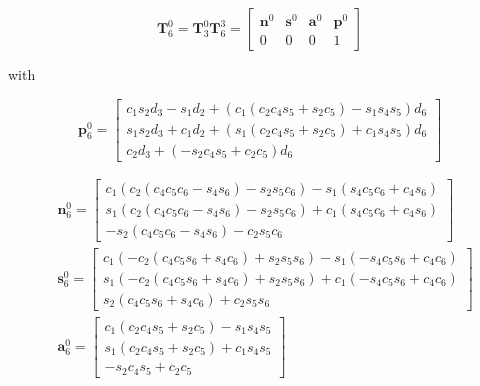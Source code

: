 \documentclass[10pt]{article}
\begin{document}
$$
\boldsymbol{T}_{6}^{0}=\boldsymbol{T}_{3}^{0} \boldsymbol{T}_{6}^{3}=\left[\begin{array}{cccc}
\boldsymbol{n}^{0} & \boldsymbol{s}^{0} & \boldsymbol{a}^{0} & \boldsymbol{p}^{0} \\
0 & 0 & 0 & 1
\end{array}\right]
$$

\noindent
with

$$
\boldsymbol{p}_{6}^{0}=\left[\begin{array}{c}
c_{1} s_{2} d_{3}-s_{1} d_{2}+\left(c_{1}\left(c_{2} c_{4} s_{5}+s_{2} c_{5}\right)-s_{1} s_{4} s_{5}\right) d_{6} \\
s_{1} s_{2} d_{3}+c_{1} d_{2}+\left(s_{1}\left(c_{2} c_{4} s_{5}+s_{2} c_{5}\right)+c_{1} s_{4} s_{5}\right) d_{6} \\
c_{2} d_{3}+\left(-s_{2} c_{4} s_{5}+c_{2} c_{5}\right) d_{6}
\end{array}\right]
$$



$$
\begin{aligned}
& \boldsymbol{n}_{6}^{0}= {\left[\begin{array}{c}
c_{1}\left(c_{2}\left(c_{4} c_{5} c_{6}-s_{4} s_{6}\right)-s_{2} s_{5} c_{6}\right)-s_{1}\left(s_{4} c_{5} c_{6}+c_{4} s_{6}\right) \\
s_{1}\left(c_{2}\left(c_{4} c_{5} c_{6}-s_{4} s_{6}\right)-s_{2} s_{5} c_{6}\right)+c_{1}\left(s_{4} c_{5} c_{6}+c_{4} s_{6}\right) \\
-s_{2}\left(c_{4} c_{5} c_{6}-s_{4} s_{6}\right)-c_{2} s_{5} c_{6}
\end{array}\right] } \\
& \boldsymbol{s}_{6}^{0}=\left[\begin{array}{c}
c_{1}\left(-c_{2}\left(c_{4} c_{5} s_{6}+s_{4} c_{6}\right)+s_{2} s_{5} s_{6}\right)-s_{1}\left(-s_{4} c_{5} s_{6}+c_{4} c_{6}\right) \\
s_{1}\left(-c_{2}\left(c_{4} c_{5} s_{6}+s_{4} c_{6}\right)+s_{2} s_{5} s_{6}\right)+c_{1}\left(-s_{4} c_{5} s_{6}+c_{4} c_{6}\right) \\
s_{2}\left(c_{4} c_{5} s_{6}+s_{4} c_{6}\right)+c_{2} s_{5} s_{6}
\end{array}\right] \\
& \boldsymbol{a}_{6}^{0}=\left[\begin{array}{c}
c_{1}\left(c_{2} c_{4} s_{5}+s_{2} c_{5}\right)-s_{1} s_{4} s_{5} \\
s_{1}\left(c_{2} c_{4} s_{5}+s_{2} c_{5}\right)+c_{1} s_{4} s_{5} \\
-s_{2} c_{4} s_{5}+c_{2} c_{5}
\end{array}\right]
\end{aligned}
$$
\end{document}
